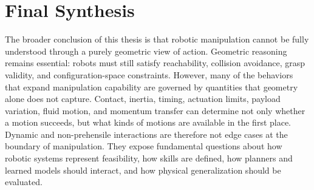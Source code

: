 \section{Final Synthesis}
\label{sec:discussion:synthesis}




The broader conclusion of this thesis is that robotic manipulation cannot be fully understood through a purely geometric view of action.
Geometric reasoning remains essential: robots must still satisfy reachability, collision avoidance, grasp validity, and configuration-space constraints.
However, many of the behaviors that expand manipulation capability are governed by quantities that geometry alone does not capture.
Contact, inertia, timing, actuation limits, payload variation, fluid motion, and momentum transfer can determine not only whether a motion succeeds, but what kinds of motions are available in the first place.
Dynamic and non-prehensile interactions are therefore not edge cases at the boundary of manipulation.
They expose fundamental questions about how robotic systems represent feasibility, how skills are defined, how planners and learned models should interact, and how physical generalization should be evaluated.

